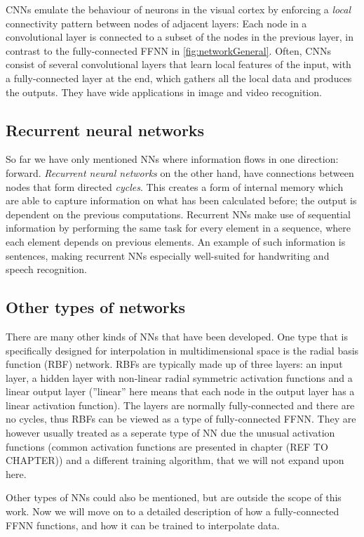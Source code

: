 \documentclass[twoside,english]{uiofysmaster}
\begin{document}
CNNs emulate the behaviour of neurons in the visual cortex by enforcing a \textit{local} connectivity pattern
between nodes of adjacent layers: Each node
in a convolutional layer is connected to a subset of the nodes in the previous layer, 
in contrast to the fully-connected FFNN in \autoref{fig:networkGeneral}.
Often, CNNs 
consist of several convolutional layers that learn local features of the input, with a fully-connected layer at the end, 
which gathers all the local data and produces the outputs. They have wide applications in image and video recognition. 

\subsection{Recurrent neural networks}
So far we have only mentioned NNs where information flows in one direction: forward. \textit{Recurrent neural networks} on
the other hand, have connections between nodes that form directed \textit{cycles}. This creates a form of 
internal memory which are able to capture information on what has been calculated before; the output is dependent 
on the previous computations. Recurrent NNs make use of sequential information by performing the same task for 
every element in a sequence, where each element depends on previous elements. An example of such information is 
sentences, making recurrent NNs especially well-suited for handwriting and speech recognition.

\subsection{Other types of networks}
There are many other kinds of NNs that have been developed. One type that is specifically designed for interpolation
in multidimensional space is the radial basis function (RBF) network. RBFs are typically made up of three layers: 
an input layer, a hidden layer with non-linear radial symmetric activation functions and a linear output layer (''linear'' here
means that each node in the output layer has a linear activation function). The layers are normally fully-connected and 
there are no cycles, thus RBFs can be viewed as a type of fully-connected FFNN. They are however usually treated as
a seperate type of NN due the unusual activation functions (common activation functions are presented in chapter
(REF TO CHAPTER)) 
and a different training algorithm, that we will not expand upon 
here. 

Other types of NNs could also be mentioned, but are outside the scope of this work. Now we will move on to a detailed description
of how a fully-connected FFNN functions, and how it can be trained to interpolate data. 
\end{document}
